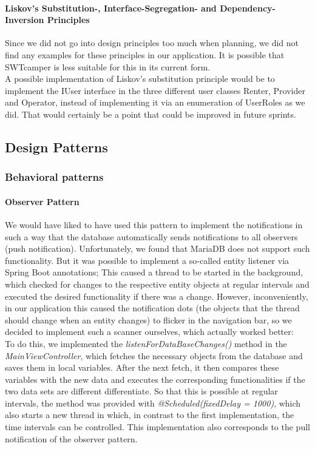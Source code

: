 \paragraph{Liskov's Substitution-, Interface-Segregation- and Dependency-Inversion Principles}
Since we did not go into design principles too much when planning, we did not find any examples for these principles in our application. It is possible that SWTcamper is less suitable for this in its current form. \\
A possible implementation of Liskov's substitution principle would be to implement the IUser interface in the three different user classes Renter, Provider and Operator, instead of implementing it via an enumeration of UserRoles as we did. That would certainly be a point that could be improved in future sprints.

\subsection{Design Patterns}

\subsubsection{Behavioral patterns}

\paragraph{Observer Pattern}
\label{subsec:observer-pattern}
We would have liked to have used this pattern to implement the notifications in such a way that the database automatically sends notifications to all observers (push notification). Unfortunately, we found that MariaDB does not support such functionality. But it was possible to implement a so-called entity listener via Spring Boot annotations; This caused a thread to be started in the background, which checked for changes to the respective entity objects at regular intervals and executed the desired functionality if there was a change. However, inconveniently, in our application this caused the notification dots (the objects that the thread should change when an entity changes) to flicker in the navigation bar, so we decided to implement such a scanner ourselves, which actually worked better: \\
To do this, we implemented the \textit{listenForDataBaseChanges()} method in the \textit{MainViewController}, which fetches the necessary objects from the database and saves them in local variables. After the next fetch, it then compares these variables with the new data and executes the corresponding functionalities if the two data sets are different differentiate. So that this is possible at regular intervals, the method was provided with \textit{@Scheduled(fixedDelay = 1000)}, which also starts a new thread in which, in contrast to the first implementation, the time intervals can be controlled. This implementation also corresponds to the pull notification of the observer pattern.

